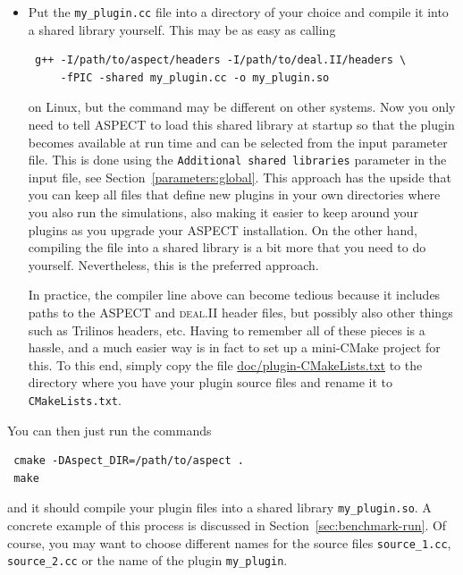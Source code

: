 \documentclass{article}
\newcommand{\dealii}{{\textsc{deal.II}}}
\newcommand{\aspect}{\textsc{ASPECT}}
\begin{document}
\begin{itemize}
\begin{itemize}
    \item Put the  \texttt{my\_plugin.cc} file into a directory of your choice
    and compile it into a shared library yourself. This may be as easy as
    calling
    \begin{verbatim}
 g++ -I/path/to/aspect/headers -I/path/to/deal.II/headers \
     -fPIC -shared my_plugin.cc -o my_plugin.so
    \end{verbatim}
    on Linux, but the command may be different on other systems. Now you only
    need to tell \aspect{} to load this shared library at startup so that the
    plugin becomes available at run time and can be selected from the input
    parameter file. This is done using the \texttt{Additional shared libraries}
    \index[prmindex]{Additional shared libraries}
    parameter in the input file, see Section~\ref{parameters:global}. This
    approach has the upside that you can keep all files that define new plugins
    in your own directories where you also run the simulations, also making it
    easier to keep around your plugins as you upgrade your \aspect{}
    installation. On the other hand, compiling the file into a shared library is
    a bit more that you need to do yourself. Nevertheless, this is the preferred
    approach.

    In practice, the compiler line above can become tedious because it includes
    paths to the \aspect{} and \dealii{} header files, but possibly also other
    things such as Trilinos headers, etc. Having to remember all of these pieces
    is a hassle, and a much easier way is in fact to set up a mini-CMake project
    for this. To this end, simply copy the file \url{doc/plugin-CMakeLists.txt}
    to the directory where you have your plugin source files and rename it to
    \texttt{CMakeLists.txt}.
  \end{itemize}
  You can then just run the commands
    \begin{verbatim}
 cmake -DAspect_DIR=/path/to/aspect .
 make
    \end{verbatim}
    and it should compile your plugin files into a shared library
    \texttt{my\_plugin.so}. A concrete example of this process is discussed in
    Section~\ref{sec:benchmark-run}. Of course, you may want to choose different names
    for the source files \texttt{source\_1.cc}, \texttt{source\_2.cc} or the name of
    the plugin \texttt{my\_plugin}.


\end{itemize}
\end{document}
